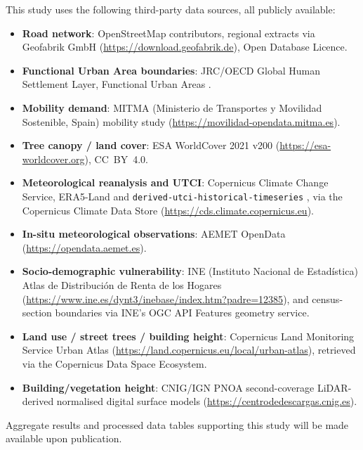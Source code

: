 \documentclass[pdflatex,sn-mathphys-ay]{sn-jnl}
\begin{document}
This study uses the following third-party data sources, all publicly
available:
\begin{itemize}
  \item \textbf{Road network}: OpenStreetMap contributors, regional extracts via
    Geofabrik GmbH (\url{https://download.geofabrik.de}), Open Database
    Licence.
  \item \textbf{Functional Urban Area boundaries}: JRC/OECD Global Human
    Settlement Layer, Functional Urban Areas \cite{ghsl_fua}.
  \item \textbf{Mobility demand}: MITMA (Ministerio de Transportes y
    Movilidad Sostenible, Spain) mobility study
    (\url{https://movilidad-opendata.mitma.es}).
  \item \textbf{Tree canopy / land cover}: ESA WorldCover 2021 v200
    \cite{esa_worldcover} (\url{https://esa-worldcover.org}), CC~BY~4.0.
  \item \textbf{Meteorological reanalysis and UTCI}: Copernicus Climate
    Change Service, ERA5-Land \cite{era5_land} and
    \texttt{derived-utci-historical-timeseries} \cite{cds_utci}, via the
    Copernicus Climate Data Store (\url{https://cds.climate.copernicus.eu}).
  \item \textbf{In-situ meteorological observations}: AEMET OpenData
    \cite{aemet_opendata} (\url{https://opendata.aemet.es}).
  \item \textbf{Socio-demographic vulnerability}: INE (Instituto Nacional de
    Estad\'istica) Atlas de Distribuci\'on de Renta de los Hogares
    \cite{ine_adrh} (\url{https://www.ine.es/dynt3/inebase/index.htm?padre=12385}),
    and census-section boundaries via INE's OGC API Features geometry
    service.
  \item \textbf{Land use / street trees / building height}: Copernicus Land
    Monitoring Service Urban Atlas \cite{urban_atlas}
    (\url{https://land.copernicus.eu/local/urban-atlas}), retrieved via the
    Copernicus Data Space Ecosystem.
  \item \textbf{Building/vegetation height}: CNIG/IGN PNOA second-coverage
    LiDAR-derived normalised digital surface models \cite{cnig_pnoa_lidar}
    (\url{https://centrodedescargas.cnig.es}).
\end{itemize}
Aggregate results and processed data tables supporting this study will be
made available upon publication.
\end{document}
